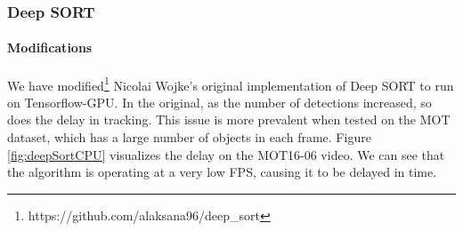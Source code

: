 \subsubsection{Deep SORT} 

\paragraph{Modifications} We have modified\footnote{https://github.com/alaksana96/deep\_sort} Nicolai Wojke's original implementation of Deep SORT to run on Tensorflow-GPU. In the original, as the number of detections increased, so does the delay in tracking. This issue is more prevalent when tested on the MOT dataset, which has a large number of objects in each frame. Figure \ref{fig:deepSortCPU} visualizes the delay on the MOT16-06 video. We can see that the algorithm is operating at a very low FPS, causing it to be delayed in time. 

